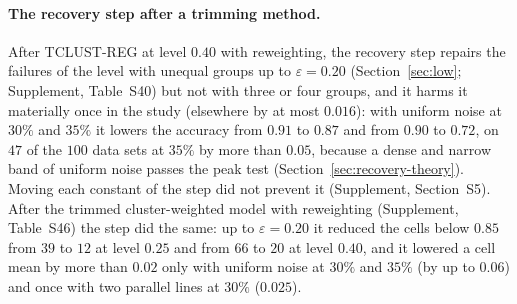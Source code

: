 \paragraph{The recovery step after a trimming method.} After TCLUST-REG at level $0.40$ with
reweighting, the recovery step repairs the failures of the level with unequal groups up to
$\varepsilon=0.20$ (Section~\ref{sec:low}; Supplement, Table~S40) but not with three or four
groups, and it harms it materially once in the study (elsewhere by at most $0.016$):
with uniform noise at $30\%$ and $35\%$ it lowers the accuracy from $0.91$ to $0.87$ and from
$0.90$ to $0.72$, on $47$ of the $100$ data sets at $35\%$ by more than $0.05$, because a dense
and narrow band of uniform noise passes the peak test (Section~\ref{sec:recovery-theory}).
Moving each constant of the step did not prevent it (Supplement, Section~S5).
After the trimmed cluster-weighted model with reweighting (Supplement, Table~S46) the step did
the same: up to $\varepsilon=0.20$ it reduced the cells below $0.85$ from $39$ to $12$ at level
$0.25$ and from $66$ to $20$ at level $0.40$, and it lowered a cell mean by more than $0.02$
only with uniform noise at $30\%$ and $35\%$ (by up to $0.06$) and once with two parallel
lines at $30\%$ ($0.025$).

